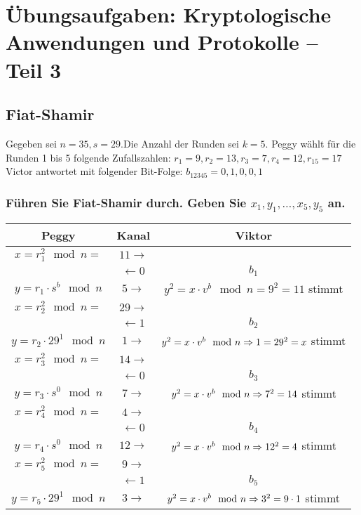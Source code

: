 \section{Übungsaufgaben: Kryptologische Anwendungen und Protokolle – Teil 3}

\subsection{Fiat-Shamir}
Gegeben sei $n = 35, s = 29$.Die Anzahl der Runden sei $k = 5$.
Peggy wählt für die Runden 1 bis 5 folgende Zufallszahlen: $r_1 = 9, r_2 = 13, r_3 = 7, r_4 = 12, r_15 = 17$
Victor antwortet mit folgender Bit-Folge: $b_{12345} = 0,1, 0,0,1$

\subsubsection{Führen Sie Fiat-Shamir durch. Geben Sie $x_1, y_1, \ldots, x_5, y_5$ an.}

\begin{tabular}{*{3}{c}}
Peggy 				      & 		Kanal 	 &		Viktor \\ \hline
$x = r_1^2 \mod n = $    & $11 \rightarrow$ &          \\
						    & $\leftarrow 0$   &   $b_1$  \\
$y = r_1 \cdot s^b\mod n$   & $5 \rightarrow$  &   $y^2 = x\cdot v^b\mod n = 9^2 = 11$ stimmt\\ \hline

$x = r_2^2 \mod n  =$  & $29 \rightarrow$ & 			   \\
						  &	$\leftarrow 1$   &	    $b_2$  \\
$y = r_2 \cdot 29^1\mod n$   & $1 \rightarrow$ &      $y^2 = x\cdot v^b\mod n \Rightarrow 1 = 29^2 = x$ stimmt\\ \hline
 			  			  

$x = r_3^2 \mod n = $    & $14 \rightarrow$ & 			   \\
						    &	$\leftarrow 0$ &	    $b_3$  \\
$y = r_3 \cdot s^0\mod n$   & $7 \rightarrow$ &      $y^2 = x\cdot v^b\mod n \Rightarrow 7^2 = 14$ stimmt\\ \hline
 			  			  
 			  			   			  			  			  			  
$x = r_4^2 \mod n =  $  & $4 \rightarrow$ & 			   \\
						  &	$\leftarrow 0$   &	    $b_4$  \\
$y = r_4 \cdot s^0\mod n$   & $12 \rightarrow$ &      $y^2 = x\cdot v^b\mod n \Rightarrow 12^2 = 4$ stimmt\\ \hline
 			  			   			  			  

$x = r_5^2 \mod n = $  & $9 \rightarrow$ & 			   \\
						  &	$\leftarrow 1$   &	    $b_5$  \\
$y = r_5 \cdot 29^1\mod n$   & $3 \rightarrow$ &      $y^2 = x\cdot v^b\mod n \Rightarrow 3^2 = 9 \cdot 1$ stimmt\\ \hline 			  			  
\end{tabular}


